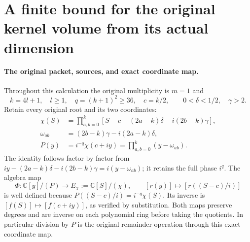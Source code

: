 \documentclass[11pt,a4paper]{article}
\begin{document}


\section{A finite bound for the original kernel volume from its actual dimension}
\label{sec:OKV}

\paragraph{The original packet, sources, and exact coordinate map.}
Throughout this calculation the original multiplicity is $m=1$ and
\[
 k=4l+1,\quad l\ge1,\quad q=(k+1)^2\ge36,\quad c=k/2,
 \qquad 0<\delta<1/2,\quad\gamma>2.
 \tag{OKV1}
\]
Retain every original root and its two coordinates:
\[
\begin{split}
 \chi(S)&=\prod_{a,b=0}^k
  [S-c-(2a-k)\delta-i(2b-k)\gamma],\\
 \omega_{ab}&=(2b-k)\gamma-i(2a-k)\delta,\\
 P(y)&=i^{-q}\chi(c+iy)=\prod_{a,b=0}^k(y-\omega_{ab}).
\end{split}
 \tag{OKV2}
\]
The identity follows factor by factor from
$iy-(2a-k)\delta-i(2b-k)\gamma=i(y-\omega_{ab})$;
it retains the full phase $i^q$. The algebra map
\[
 \Phi:\mathbb C[y]/(P)\longrightarrow E_\chi:=\mathbb C[S]/(\chi),
 \qquad [r(y)]\longmapsto[r((S-c)/i)]
 \tag{OKV3}
\]
is well defined because $P((S-c)/i)=i^{-q}\chi(S)$.
Its inverse is $[f(S)]\mapsto[f(c+iy)]$, as verified by substitution.
Both maps preserve degrees and are inverse on each polynomial ring
before taking the quotients. In particular division by $P$ is the
original remainder operation through this exact coordinate map.
\end{document}
